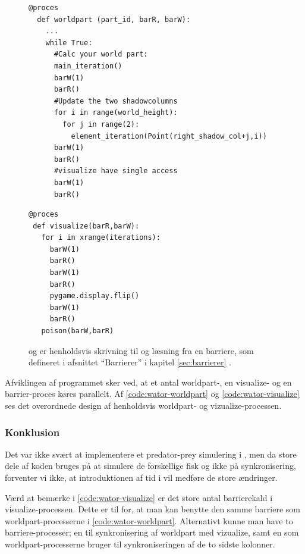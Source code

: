 \begin{figure}[hbtp] 
\begin{minipage}{\linewidth}
\begin{lstlisting}[label=code:wator-worldpart,caption=Uddrag af worldpart-processen i WaTor]
  @proces
  def worldpart (part_id, barR, barW):  
    ...  
    while True:
      #Calc your world part:
      main_iteration()
      barW(1)
      barR()
      #Update the two shadowcolumns
      for i in range(world_height):
        for j in range(2):
          element_iteration(Point(right_shadow_col+j,i))
      barW(1)
      barR()
      #visualize have single access
      barW(1)
      barR()
\end{lstlisting}

\begin{lstlisting}[label=code:wator-visualize,caption=Uddrag af visualize-processen i WaTor]
@proces
 def visualize(barR,barW):
   for i in xrange(iterations):
     barW(1)
     barR()
     barW(1)
     barR()
     pygame.display.flip()
     barW(1)
     barR()
   poison(barW,barR)
\end{lstlisting}

\end{minipage}
\caption[test]{ og  er henholdsvis skrivning til og læsning fra en barriere, som defineret i afsnittet ``Barrierer'' i kapitel \ref{sec:barrierer} .}
\end{figure}
Afviklingen af programmet sker ved, at et antal worldpart-, en 
visualize- og en barrier-proces køres parallelt. Af 
\autoref{code:wator-worldpart} og \cref{code:wator-visualize} ses det 
overordnede design af henholdsvis worldpart- og 
vizualize-processen.  
\subsubsection{Konklusion} 
Det var ikke svært at implementere et predator-prey simulering i \pycsp, men da store dele af koden bruges på at simulere  de forskellige fisk og ikke på synkronisering, forventer vi ikke, at introduktionen af tid i \pycsp vil medføre de store ændringer. 

Værd at bemærke i \cref{code:wator-visualize} er det store antal barrierekald i 
visualize-processen. Dette er til for, at man kan benytte den samme barriere som 
worldpart-processerne i \cref{code:wator-worldpart}. Alternativt kunne man have to barriere-processer; en til 
synkronisering af worldpart med vizualize, samt en som 
worldpart-processerne bruger til synkroniseringen af de to sidste kolonner. 

